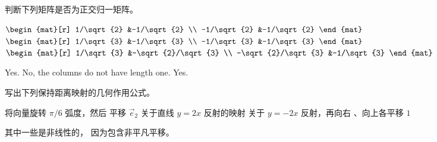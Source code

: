 \begin{exercises}
  \item 
    判断下列矩阵是否为正交归一矩阵。
    \begin{exparts}
      \partsitem $\begin{mat}[r]
                    1/\sqrt{2} &-1/\sqrt{2}  \\
                   -1/\sqrt{2} &-1/\sqrt{2}
                  \end{mat}$
      \partsitem $\begin{mat}[r]
                    1/\sqrt{3} &-1/\sqrt{3}  \\
                   -1/\sqrt{3} &-1/\sqrt{3}
                  \end{mat}$
      \partsitem $\begin{mat}[r]
                    1/\sqrt{3} &-\sqrt{2}/\sqrt{3}  \\
                   -\sqrt{2}/\sqrt{3} &-1/\sqrt{3}
                  \end{mat}$
    \end{exparts}
    \begin{answer}
      \begin{exparts}
        \partsitem Yes.
        \partsitem No, the columns do not have length one.
        \partsitem Yes.
      \end{exparts}
    \end{answer}
  \item 
    写出下列保持距离映射的几何作用公式。
    \begin{exparts}  
      \partsitem 将向量旋转 $\pi/6$ 弧度，然后
        平移 $\vec{e}_2$
      \partsitem 关于直线 $y=2x$ 反射的映射
      \partsitem 关于 $y=-2x$ 反射，再向右
        、向上各平移 $1$
    \end{exparts}
    \begin{answer}
      其中一些是非线性的，
      因为包含非平凡平移。
\end{answer}
\end{exercises}
